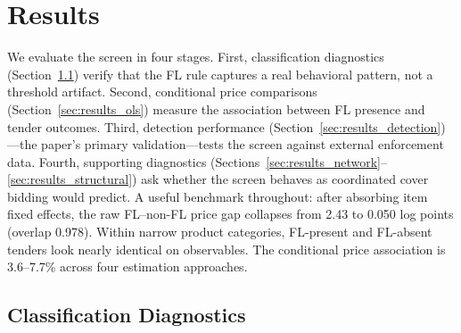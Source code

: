
\section{Results}
\label{sec:results}

We evaluate the screen in four stages. First, classification
diagnostics (Section~\ref{sec:class_diagnostics}) verify that the FL
rule captures a real behavioral pattern, not a threshold artifact.
Second, conditional price comparisons
(Section~\ref{sec:results_ols}) measure the association between FL
presence and tender outcomes. Third, detection performance
(Section~\ref{sec:results_detection})---the paper's primary
validation---tests the screen against external enforcement data.
Fourth, supporting diagnostics
(Sections~\ref{sec:results_network}--\ref{sec:results_structural})
ask whether the screen behaves as coordinated cover bidding would
predict. A useful benchmark throughout: after absorbing item fixed
effects, the raw FL--non-FL price gap collapses from 2.43 to 0.050
log points (overlap 0.978). Within narrow product categories,
FL-present and FL-absent tenders look nearly identical on
observables. The conditional price association is 3.6--7.7\% across
four estimation approaches.


\subsection{Classification Diagnostics}
\label{sec:class_diagnostics}

